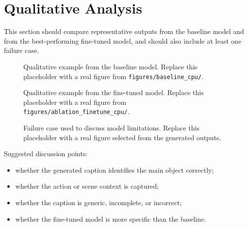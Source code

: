 
\section{Qualitative Analysis}

This section should compare representative outputs from the baseline model
and from the best-performing fine-tuned model, and should also include at
least one failure case.

\begin{figure}[H]
    \centering
    \caption{Qualitative example from the baseline model. Replace this placeholder with a real figure from \texttt{figures/baseline\_cpu/}.}
    \label{fig:baseline_qualitative}
\end{figure}

\begin{figure}[H]
    \centering
    \caption{Qualitative example from the fine-tuned model. Replace this placeholder with a real figure from \texttt{figures/ablation\_finetune\_cpu/}.}
    \label{fig:finetune_qualitative}
\end{figure}

\begin{figure}[H]
    \centering
    \caption{Failure case used to discuss model limitations. Replace this placeholder with a real figure selected from the generated outputs.}
    \label{fig:failure_case}
\end{figure}

\noindent Suggested discussion points:
\begin{itemize}
    \item whether the generated caption identifies the main object correctly;
    \item whether the action or scene context is captured;
    \item whether the caption is generic, incomplete, or incorrect;
    \item whether the fine-tuned model is more specific than the baseline.
\end{itemize}
